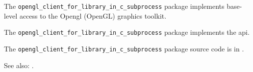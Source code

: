
The {\tt opengl\_client\_for\_library\_in\_c\_subprocess} package implements base-level access to the Opengl (OpenGL) graphics 
toolkit.

The {\tt opengl\_client\_for\_library\_in\_c\_subprocess} package implements the  api.

The {\tt opengl\_client\_for\_library\_in\_c\_subprocess} package source code is in .

See also:  .


